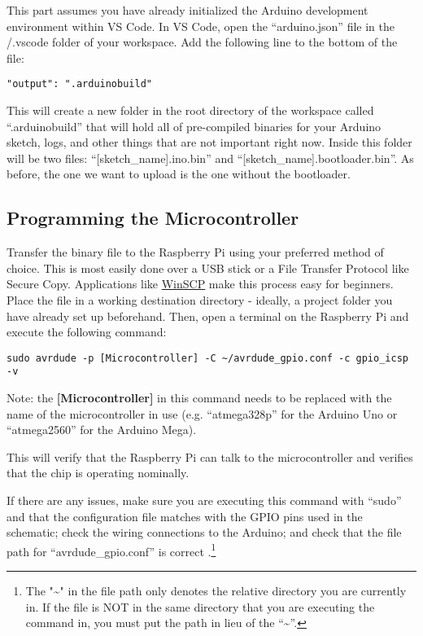     This part assumes you have already initialized the Arduino development environment within VS Code.
    In VS Code, open the ``arduino.json'' file in the /.vscode folder of your workspace. Add the following line to the bottom of the file:

    \begin{lstlisting}[style=kaolstplain,linewidth=1.5\textwidth]
    "output": ".arduinobuild"
    \end{lstlisting}

    This will create a new folder in the root directory of the workspace called ``.arduinobuild'' that will hold all of pre-compiled binaries for your Arduino sketch, logs, and other things that are not important right now.
    Inside this folder will be two files: ``[sketch\_name].ino.bin'' and ``[sketch\_name].bootloader.bin''.
    As before, the one we want to upload is the one without the bootloader.\footnotemark[1]

    \subsection*{Programming the Microcontroller}

    Transfer the binary file to the Raspberry Pi using your preferred method of choice.
    This is most easily done over a USB stick or a File Transfer Protocol like Secure Copy.
    Applications like \href{https://winscp.net/eng/download.php}{WinSCP} make this process easy for beginners.
    Place the file in a working destination directory - ideally, a project folder you have already set up beforehand.
    Then, open a terminal on the Raspberry Pi and execute the following command:
    
    \begin{lstlisting}[style=kaolstplain,linewidth=1.5\textwidth]
    sudo avrdude -p [Microcontroller] -C ~/avrdude_gpio.conf -c gpio_icsp -v
    \end{lstlisting}

    Note: the \textbf{[Microcontroller]} in this command needs to be replaced with the name of the microcontroller in use (e.g. ``atmega328p'' for the Arduino Uno or ``atmega2560'' for the Arduino Mega).

    This will verify that the Raspberry Pi can talk to the microcontroller and verifies that the chip is operating nominally.

    If there are any issues, make sure you are executing this command with ``sudo'' and that the configuration file matches with the GPIO pins used in the schematic; check the wiring connections to the Arduino; and check that the file path for ``avrdude\_gpio.conf'' is correct .\footnote{The "\textasciitilde" in the file path only denotes the relative directory you are currently in. If the file is NOT in the same directory that you are executing the command in, you must put the path in lieu of the “\textasciitilde ”.}

